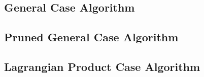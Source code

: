 \subsection{General Case Algorithm}\label{subsec:general-case-algorithm-proof}


\subsection{Pruned General Case Algorithm}\label{subsec:pruned-general-case-algorithm}


\subsection{Lagrangian Product Case Algorithm}\label{subsec:lagrangian-product-algorithm-proof}

